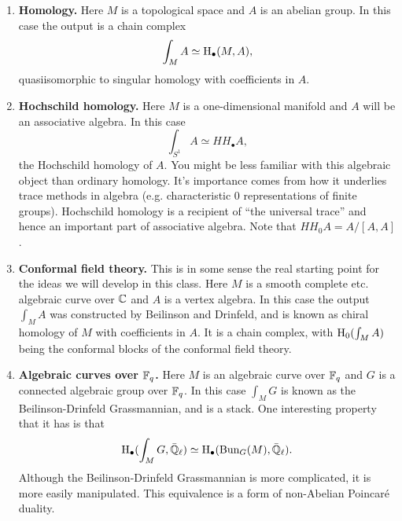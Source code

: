 \documentclass{amsart}
\begin{document}
\begin{enumerate}

    \item \textbf{Homology.} Here $M$ is a topological space and $A$ is an abelian group.
        In this case the output is a chain complex
        \begin{equation*}
            \int_M A \simeq \operatorname{H}_\bullet(M,A),
        \end{equation*}
        quasiisomorphic to singular homology with coefficients in $A$.

    \item  \textbf{Hochschild homology.} Here $M$ is a one-dimensional manifold and $A$
        will be an associative algebra. In this case
        \begin{equation*}
            \int_{S^1} A \simeq HH_\bullet A,
        \end{equation*}
        the Hochschild homology of $A$.
        You might be less familiar with this algebraic object than ordinary
        homology. It's importance comes from how it underlies trace methods
        in algebra (e.g. characteristic 0 representations of finite groups).
        Hochschild homology is a recipient of ``the universal trace'' and hence
        an important part of associative algebra. Note that
        $HH_0A=A/[A,A]$.
        
    \item \textbf{Conformal field theory.} This is in some sense the real starting point
        for the ideas we will develop in this class. Here $M$ is a smooth complete etc.
        algebraic curve over $\mathbb{C}$ and $A$ is a vertex algebra. In this case
        the output $\int_M A$ was constructed by Beilinson and Drinfeld, and
        is known as chiral homology of $M$ with coefficients in $A$. It is
        a chain complex, with $\operatorname{H}_0(\int_M A)$ being the conformal blocks of
        the conformal field theory.

    \item \textbf{Algebraic curves over $\mathbb{F}_q$.} Here $M$ is an algebraic curve over $\mathbb{F}_q$
        and $G$ is a connected algebraic group over $\mathbb{F}_q$. In this case $\int_MG$ is known
        as the Beilinson-Drinfeld Grassmannian, and is a stack. One interesting
        property that it has is that
        \begin{equation*}
            \operatorname{H}_\bullet(\int_M G,\bar{\mathbb{Q}}_\ell) \simeq \operatorname{H}_\bullet(\text{Bun}_G(M),\bar{\mathbb{Q}}_\ell).
        \end{equation*}
        Although the Beilinson-Drinfeld Grassmannian is more complicated, it is
        more easily manipulated. This equivalence is a form of non-Abelian
        Poincar\'e duality.


\end{enumerate}
\end{document}

